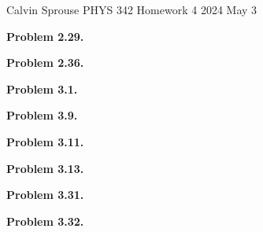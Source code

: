 \documentclass[a4paper, 12pt]{config/homework}
\begin{document}
\noindent
\hfill Calvin Sprouse \hfill PHYS 342 Homework 4 \hfill 2024 May 3 \hfill

\bigskip\noindent
\textbf{Problem 2.29.}


\bigskip\noindent
\textbf{Problem 2.36.}


\bigskip\noindent
\textbf{Problem 3.1.}


\bigskip\noindent
\textbf{Problem 3.9.}


\bigskip\noindent
\textbf{Problem 3.11.}


\bigskip\noindent
\textbf{Problem 3.13.}


\bigskip\noindent
\textbf{Problem 3.31.}


\bigskip\noindent
\textbf{Problem 3.32.}
\end{document}
